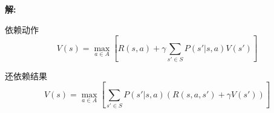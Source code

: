 \documentclass[8pt]{article}
\begin{document}
\begin{enumerate}[(a)]
\textbf{\large 解:}

依赖动作
\[
V(s) = \max_{a \in A} \left[ R(s, a) + \gamma \sum_{s' \in S} P(s' | s, a) V(s') \right]
\]

还依赖结果
\[ V(s) = \max_{a \in A} \left[ \sum_{s' \in S} P(s' | s, a) \left( R(s, a, s') + \gamma V(s') \right) \right] \]

\vspace{3em}



\end{enumerate}
\end{document}
